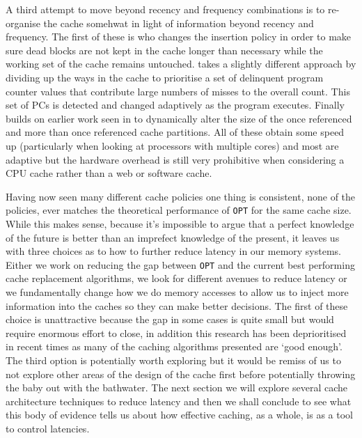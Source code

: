 A third attempt to move beyond recency and frequency combinations is to re-organise the cache somehwat in light of information beyond recency and frequency. The first of these is \citet{chaudhuriPseudoLIFOFoundationNew2009a} who changes the insertion policy in order to make sure dead blocks are not kept in the cache longer than necessary while the working set of the cache remains untouched. \citet{manikantanNUcacheEfficientMulticore2011} takes a slightly different approach by dividing up the ways in the cache to prioritise a set of delinquent program counter values that contribute large numbers of misses to the overall count. This set of PCs is detected and changed adaptively as the program executes. Finally \citet{khanDecoupledDynamicCache2012} builds on earlier work seen in \citet{johnson2QLowOverhead1994} to dynamically alter the size of the once referenced and more than once referenced cache partitions. All of these obtain some speed up (particularly when looking at processors with multiple cores) and most are adaptive but the hardware overhead is still very prohibitive when considering a CPU cache rather than a web or software cache.

Having now seen many different cache policies one thing is consistent, none of the policies, ever matches the theoretical performance of \texttt{OPT} for the same cache size. While this makes sense, because it's impossible to argue that a perfect knowledge of the future is better than an imprefect knowledge of the present, it leaves us with three choices as to how to further reduce latency in our memory systems. Either we work on reducing the gap between \texttt{OPT} and the current best performing cache replacement algorithms, we look for different avenues to reduce latency or we fundamentally change how we do memory accesses to allow us to inject more information into the caches so they can make better decisions. The first of these choice is unattractive because the gap in some cases is quite small but would require enormous effort to close, in addition this research has been deprioritised in recent times \cite{podlipnigSurveyWebCache2003} as many of the caching algorithms presented are `good enough'. The third option is potentially worth exploring but it would be remiss of us to not explore other areas of the design of the cache first before potentially throwing the baby out with the bathwater. The next section we will explore several cache architecture techniques to reduce latency and then we shall conclude to see what this body of evidence tells us about how effective caching, as a whole, is as a tool to control latencies.

